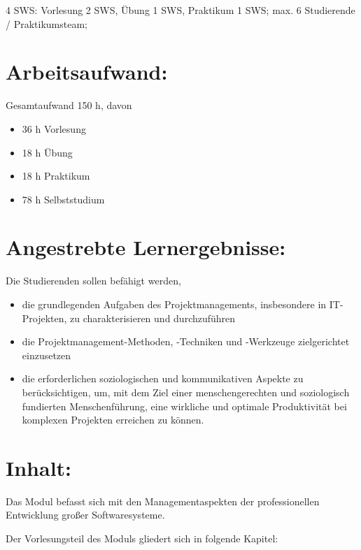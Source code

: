4 SWS: Vorlesung 2 SWS, Übung 1 SWS, Praktikum 1 SWS; max. 6 Studierende
/ Praktikumsteam;

\section*{Arbeitsaufwand:}\label{arbeitsaufwand-19}

Gesamtaufwand 150 h, davon

\begin{itemize}
\tightlist
\item
  36 h Vorlesung
\item
  18 h Übung
\item
  18 h Praktikum
\item
  78 h Selbststudium
\end{itemize}

\section*{Angestrebte
Lernergebnisse:}\label{angestrebte-lernergebnisse-20}

Die Studierenden sollen befähigt werden,

\begin{itemize}
\tightlist
\item
  die grundlegenden Aufgaben des Projektmanagements, insbesondere in
  IT-Projekten, zu charakterisieren und durchzuführen
\item
  die Projektmanagement-Methoden, -Techniken und -Werkzeuge
  zielgerichtet einzusetzen
\item
  die erforderlichen soziologischen und kommunikativen Aspekte zu
  berücksichtigen, um, mit dem Ziel einer menschengerechten und
  soziologisch fundierten Menschenführung, eine wirkliche und optimale
  Produktivität bei komplexen Projekten erreichen zu können.
\end{itemize}

\section*{Inhalt:}\label{inhalt-20}

Das Modul befasst sich mit den Managementaspekten der professionellen
Entwicklung großer Softwaresysteme.

Der Vorlesungsteil des Moduls gliedert sich in folgende Kapitel:

